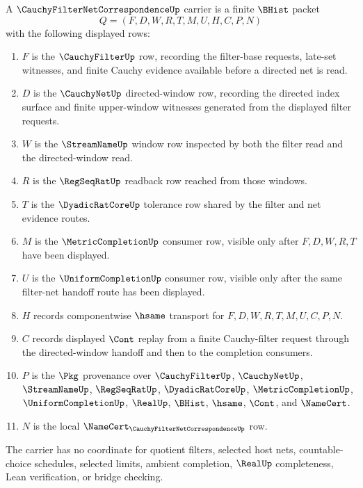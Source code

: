 \begin{definition}
\label{def:cauchy-filter-net-correspondence-carrier}
A $\CauchyFilterNetCorrespondenceUp$ carrier is a finite $\BHist$ packet
$$
Q=(F,D,W,R,T,M,U,H,C,P,N)
$$
with the following displayed rows:
\begin{enumerate}
\item $F$ is the $\CauchyFilterUp$ row, recording the filter-base requests, late-set witnesses, and finite Cauchy evidence available before a directed net is read.
\item $D$ is the $\CauchyNetUp$ directed-window row, recording the directed index surface and finite upper-window witnesses generated from the displayed filter requests.
\item $W$ is the $\StreamNameUp$ window row inspected by both the filter read and the directed-window read.
\item $R$ is the $\RegSeqRatUp$ readback row reached from those windows.
\item $T$ is the $\DyadicRatCoreUp$ tolerance row shared by the filter and net evidence routes.
\item $M$ is the $\MetricCompletionUp$ consumer row, visible only after $F,D,W,R,T$ have been displayed.
\item $U$ is the $\UniformCompletionUp$ consumer row, visible only after the same filter-net handoff route has been displayed.
\item $H$ records componentwise $\hsame$ transport for $F,D,W,R,T,M,U,C,P,N$.
\item $C$ records displayed $\Cont$ replay from a finite Cauchy-filter request through the directed-window handoff and then to the completion consumers.
\item $P$ is the $\Pkg$ provenance over $\CauchyFilterUp$, $\CauchyNetUp$, $\StreamNameUp$, $\RegSeqRatUp$, $\DyadicRatCoreUp$, $\MetricCompletionUp$, $\UniformCompletionUp$, $\RealUp$, $\BHist$, $\hsame$, $\Cont$, and $\NameCert$.
\item $N$ is the local $\NameCert_{\CauchyFilterNetCorrespondenceUp}$ row.
\end{enumerate}
The carrier has no coordinate for quotient filters, selected host nets, countable-choice schedules, selected limits, ambient completion, $\RealUp$ completeness, Lean verification, or bridge checking.
\end{definition}

